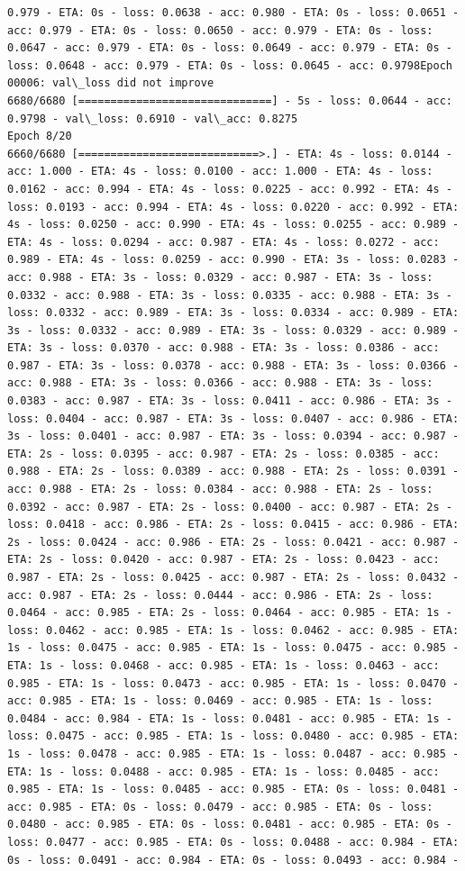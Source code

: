 \documentclass[11pt]{article}
\begin{document}
\begin{Verbatim}[commandchars=\\\{\}]
0.979 - ETA: 0s - loss: 0.0638 - acc: 0.980 - ETA: 0s - loss: 0.0651 - acc: 0.979 - ETA: 0s - loss: 0.0650 - acc: 0.979 - ETA: 0s - loss: 0.0647 - acc: 0.979 - ETA: 0s - loss: 0.0649 - acc: 0.979 - ETA: 0s - loss: 0.0648 - acc: 0.979 - ETA: 0s - loss: 0.0645 - acc: 0.9798Epoch 00006: val\_loss did not improve
6680/6680 [==============================] - 5s - loss: 0.0644 - acc: 0.9798 - val\_loss: 0.6910 - val\_acc: 0.8275
Epoch 8/20
6660/6680 [============================>.] - ETA: 4s - loss: 0.0144 - acc: 1.000 - ETA: 4s - loss: 0.0100 - acc: 1.000 - ETA: 4s - loss: 0.0162 - acc: 0.994 - ETA: 4s - loss: 0.0225 - acc: 0.992 - ETA: 4s - loss: 0.0193 - acc: 0.994 - ETA: 4s - loss: 0.0220 - acc: 0.992 - ETA: 4s - loss: 0.0250 - acc: 0.990 - ETA: 4s - loss: 0.0255 - acc: 0.989 - ETA: 4s - loss: 0.0294 - acc: 0.987 - ETA: 4s - loss: 0.0272 - acc: 0.989 - ETA: 4s - loss: 0.0259 - acc: 0.990 - ETA: 3s - loss: 0.0283 - acc: 0.988 - ETA: 3s - loss: 0.0329 - acc: 0.987 - ETA: 3s - loss: 0.0332 - acc: 0.988 - ETA: 3s - loss: 0.0335 - acc: 0.988 - ETA: 3s - loss: 0.0332 - acc: 0.989 - ETA: 3s - loss: 0.0334 - acc: 0.989 - ETA: 3s - loss: 0.0332 - acc: 0.989 - ETA: 3s - loss: 0.0329 - acc: 0.989 - ETA: 3s - loss: 0.0370 - acc: 0.988 - ETA: 3s - loss: 0.0386 - acc: 0.987 - ETA: 3s - loss: 0.0378 - acc: 0.988 - ETA: 3s - loss: 0.0366 - acc: 0.988 - ETA: 3s - loss: 0.0366 - acc: 0.988 - ETA: 3s - loss: 0.0383 - acc: 0.987 - ETA: 3s - loss: 0.0411 - acc: 0.986 - ETA: 3s - loss: 0.0404 - acc: 0.987 - ETA: 3s - loss: 0.0407 - acc: 0.986 - ETA: 3s - loss: 0.0401 - acc: 0.987 - ETA: 3s - loss: 0.0394 - acc: 0.987 - ETA: 2s - loss: 0.0395 - acc: 0.987 - ETA: 2s - loss: 0.0385 - acc: 0.988 - ETA: 2s - loss: 0.0389 - acc: 0.988 - ETA: 2s - loss: 0.0391 - acc: 0.988 - ETA: 2s - loss: 0.0384 - acc: 0.988 - ETA: 2s - loss: 0.0392 - acc: 0.987 - ETA: 2s - loss: 0.0400 - acc: 0.987 - ETA: 2s - loss: 0.0418 - acc: 0.986 - ETA: 2s - loss: 0.0415 - acc: 0.986 - ETA: 2s - loss: 0.0424 - acc: 0.986 - ETA: 2s - loss: 0.0421 - acc: 0.987 - ETA: 2s - loss: 0.0420 - acc: 0.987 - ETA: 2s - loss: 0.0423 - acc: 0.987 - ETA: 2s - loss: 0.0425 - acc: 0.987 - ETA: 2s - loss: 0.0432 - acc: 0.987 - ETA: 2s - loss: 0.0444 - acc: 0.986 - ETA: 2s - loss: 0.0464 - acc: 0.985 - ETA: 2s - loss: 0.0464 - acc: 0.985 - ETA: 1s - loss: 0.0462 - acc: 0.985 - ETA: 1s - loss: 0.0462 - acc: 0.985 - ETA: 1s - loss: 0.0475 - acc: 0.985 - ETA: 1s - loss: 0.0475 - acc: 0.985 - ETA: 1s - loss: 0.0468 - acc: 0.985 - ETA: 1s - loss: 0.0463 - acc: 0.985 - ETA: 1s - loss: 0.0473 - acc: 0.985 - ETA: 1s - loss: 0.0470 - acc: 0.985 - ETA: 1s - loss: 0.0469 - acc: 0.985 - ETA: 1s - loss: 0.0484 - acc: 0.984 - ETA: 1s - loss: 0.0481 - acc: 0.985 - ETA: 1s - loss: 0.0475 - acc: 0.985 - ETA: 1s - loss: 0.0480 - acc: 0.985 - ETA: 1s - loss: 0.0478 - acc: 0.985 - ETA: 1s - loss: 0.0487 - acc: 0.985 - ETA: 1s - loss: 0.0488 - acc: 0.985 - ETA: 1s - loss: 0.0485 - acc: 0.985 - ETA: 1s - loss: 0.0485 - acc: 0.985 - ETA: 0s - loss: 0.0481 - acc: 0.985 - ETA: 0s - loss: 0.0479 - acc: 0.985 - ETA: 0s - loss: 0.0480 - acc: 0.985 - ETA: 0s - loss: 0.0481 - acc: 0.985 - ETA: 0s - loss: 0.0477 - acc: 0.985 - ETA: 0s - loss: 0.0488 - acc: 0.984 - ETA: 0s - loss: 0.0491 - acc: 0.984 - ETA: 0s - loss: 0.0493 - acc: 0.984 - 
\end{Verbatim}
\end{document}
